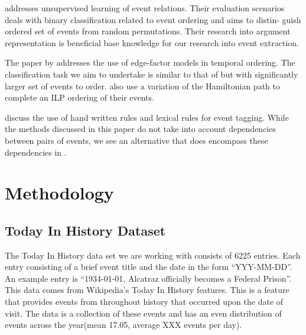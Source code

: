 \documentclass[bsc,frontabs,twoside,singlespacing,parskip,deptreport]{infthesis}     %
\begin{document}
\cite{chambers2009unsupervised}addresses unsupervised learning of event relations. Their evaluation
scenarios deals with binary classification related to event ordering and aims to distin-
guish ordered set of events from random permutations. Their research into argument representation is beneficial base
knowledge for our research into event extraction.

The paper by \cite{abend2015lexical} addresses the use of
edge-factor models in temporal ordering. The classification task we aim to undertake is similar to that of \cite{abend2015lexical}
but with significantly larger set of events to order. \cite{abend2015lexical} also use a variation of the Hamiltonian path
to complete an ILP ordering of their events.

\cite{mani2006machine} discuss the use of hand written rules and lexical rules for event tagging. While the methods discussed in this paper
do not take into account dependencies between pairs of events, we see an alternative that does encompass
these dependencies in \cite{schapire1998learning}.  


\chapter{Methodology}


\section{Today In History Dataset}
The Today In History data set we are working with consists of 6225 entries. Each entry consisting
of a  brief event title and the date in the form ``YYY-MM-DD''.
An example entry is ``1934-01-01, Alcatraz officially becomes a Federal Prison''.
This data comes from Wikipedia's Today In History features. This is a feature that provides events from
throughout history that occurred upon the date of visit. The data is a collection of these events and has
an even distribution of events across the year(mean 17.05, average XXX events per day).
\end{document}
